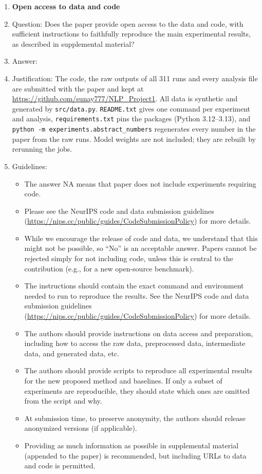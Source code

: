 \begin{enumerate}
\item {\bf Open access to data and code}
    \item[] Question: Does the paper provide open access to the data and code, with sufficient instructions to faithfully reproduce the main experimental results, as described in supplemental material?
    \item[] Answer: \answerYes{}
    \item[] Justification: The code, the raw outputs of all 311 runs and every analysis file are submitted with the paper and kept at \url{https://github.com/sunay777/NLP_Project1}. All data is synthetic and generated by \texttt{src/data.py}. \texttt{README.txt} gives one command per experiment and analysis, \texttt{requirements.txt} pins the packages (Python 3.12--3.13), and \texttt{python -m experiments.abstract\_numbers} regenerates every number in the paper from the raw runs. Model weights are not included; they are rebuilt by rerunning the jobs.
    \item[] Guidelines:
    \begin{itemize}
        \item The answer NA means that paper does not include experiments requiring code.
        \item Please see the NeurIPS code and data submission guidelines (\url{https://nips.cc/public/guides/CodeSubmissionPolicy}) for more details.
        \item While we encourage the release of code and data, we understand that this might not be possible, so “No” is an acceptable answer. Papers cannot be rejected simply for not including code, unless this is central to the contribution (e.g., for a new open-source benchmark).
        \item The instructions should contain the exact command and environment needed to run to reproduce the results. See the NeurIPS code and data submission guidelines (\url{https://nips.cc/public/guides/CodeSubmissionPolicy}) for more details.
        \item The authors should provide instructions on data access and preparation, including how to access the raw data, preprocessed data, intermediate data, and generated data, etc.
        \item The authors should provide scripts to reproduce all experimental results for the new proposed method and baselines. If only a subset of experiments are reproducible, they should state which ones are omitted from the script and why.
        \item At submission time, to preserve anonymity, the authors should release anonymized versions (if applicable).
        \item Providing as much information as possible in supplemental material (appended to the paper) is recommended, but including URLs to data and code is permitted.
    \end{itemize}



\end{enumerate}

